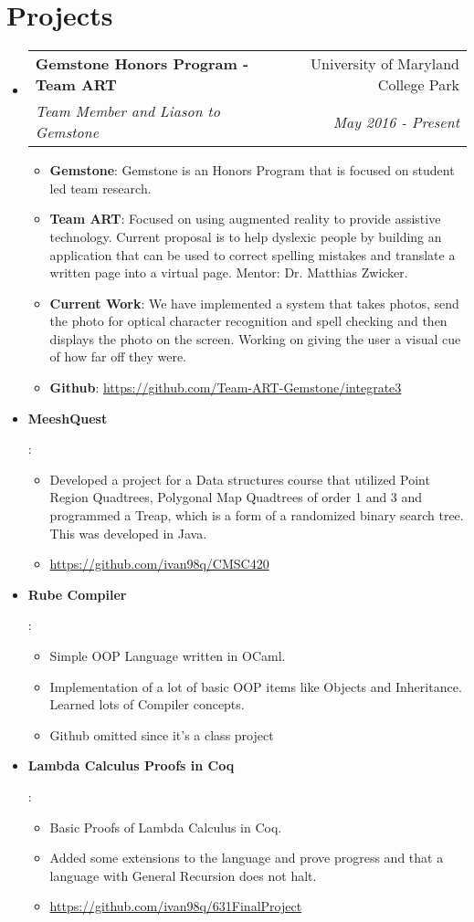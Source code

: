 \documentclass[letterpaper,10.95pt]{article}
\makeatletter
\newcommand{\resumeItem}[2]{
  \item\small{
    \textbf{#1}{: #2 \vspace{-2pt}}
  }
}
\newcommand{\resumeSubheading}[4]{
  \vspace{-1pt}\item
    \begin{tabular*}{0.97\textwidth}{l@{\extracolsep{\fill}}r}
      \textbf{#1} & #2 \\
      \textit{\small#3} & \textit{\small #4} \\
    \end{tabular*}\vspace{-5pt}
}
\newcommand{\resumeSubItem}[2]{\resumeItem{#1}{#2}\vspace{-4pt}}
\newcommand{\resumeSubHeadingListStart}{\begin{itemize}[leftmargin=*]}
\newcommand{\resumeSubHeadingListEnd}{\end{itemize}}
\newcommand{\resumeItemListStart}{\begin{itemize}}
\newcommand{\resumeItemListEnd}{\end{itemize}\vspace{-5pt}}
\makeatother
\begin{document}
\section{Projects}
  \resumeSubHeadingListStart
    \resumeSubheading{Gemstone Honors Program - Team ART}{University of Maryland College Park}
	{Team Member and Liason to Gemstone}{May 2016 - Present}
      \resumeItemListStart
		\resumeItem{Gemstone}{Gemstone is an Honors Program that is focused on student led team research.}
		\resumeItem{Team ART}{Focused on using augmented reality to provide assistive technology. Current proposal is to help dyslexic people by building an application that can be used to correct spelling mistakes and translate a written page into a virtual page. Mentor: Dr. Matthias Zwicker.}
		\resumeItem {Current Work}{We have implemented a system that takes photos, send the photo for optical character recognition and spell checking and then displays the photo on the screen. Working on giving the user a visual cue of how far off they were.}
		\resumeItem{Github}{\href{https://github.com/Team-ART-Gemstone/integrate3}{https://github.com/Team-ART-Gemstone/integrate3}}
	\resumeItemListEnd
    \resumeSubItem{MeeshQuest} {\begin{itemize}
	\item Developed a project for a Data structures course that utilized Point Region Quadtrees, Polygonal Map Quadtrees of order 1 and 3 and programmed a Treap, which is a form of a randomized binary search tree. This was developed in Java.
	\item  \href{https://github.com/ivan98q/CMSC420}{https://github.com/ivan98q/CMSC420}\end{itemize}}
    \resumeSubItem{Rube Compiler}{\begin{itemize} \item Simple OOP Language written in OCaml. \item Implementation of a lot of basic OOP items like Objects and Inheritance. Learned lots of Compiler concepts.
\item Github omitted since it's a class project \end{itemize}}
	
      \resumeSubItem{Lambda Calculus Proofs in Coq}{\begin{itemize}\item Basic Proofs of Lambda Calculus in Coq. \item Added some extensions to the language and prove progress and that a language with General Recursion does not halt. \item \href{https://github.com/ivan98q/631FinalProject}{https://github.com/ivan98q/631FinalProject} \end{itemize}}
  \resumeSubHeadingListEnd
\end{document}

